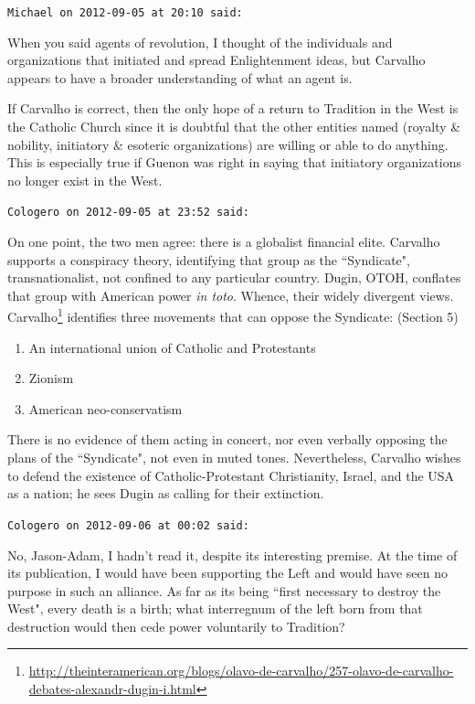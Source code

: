 \begin{footnotesize}
\begin{sffamily}
\hfill

\texttt{Michael on 2012-09-05 at 20:10 said: }

When you said agents of revolution, I thought of the individuals and organizations that initiated and spread Enlightenment ideas, but Carvalho appears to have a broader understanding of what an agent is.

If Carvalho is correct, then the only hope of a return to Tradition in the West is the Catholic Church since it is doubtful that the other entities named (royalty \& nobility, initiatory \& esoteric organizations) are willing or able to do anything. This is especially true if Guenon was right in saying that initiatory organizations no longer exist in the West.


\hfill

\texttt{Cologero on 2012-09-05 at 23:52 said: }

On one point, the two men agree: there is a globalist financial elite. Carvalho supports a conspiracy theory, identifying that group as the ``Syndicate", transnationalist, not confined to any particular country. Dugin, OTOH, conflates that group with American power \emph{in toto}. Whence, their widely divergent views. Carvalho\footnote{\url{http://theinteramerican.org/blogs/olavo-de-carvalho/257-olavo-de-carvalho-debates-alexandr-dugin-i.html}} identifies three movements that can oppose the Syndicate: (Section 5)

\begin{enumerate}
\item An international union of Catholic and Protestants 
\item Zionism 
\item American neo-conservatism 
\end{enumerate}
There is no evidence of them acting in concert, nor even verbally opposing the plans of the ``Syndicate", not even in muted tones. Nevertheless, Carvalho wishes to defend the existence of Catholic-Protestant Christianity, Israel, and the USA as a nation; he sees Dugin as calling for their extinction.


\hfill

\texttt{Cologero on 2012-09-06 at 00:02 said: }

No, Jason-Adam, I hadn't read it, despite its interesting premise. At the time of its publication, I would have been supporting the Left and would have seen no purpose in such an alliance. As far as its being ``first necessary to destroy the West", every death is a birth; what interregnum of the left born from that destruction would then cede power voluntarily to Tradition?


\end{sffamily}
\end{footnotesize}
